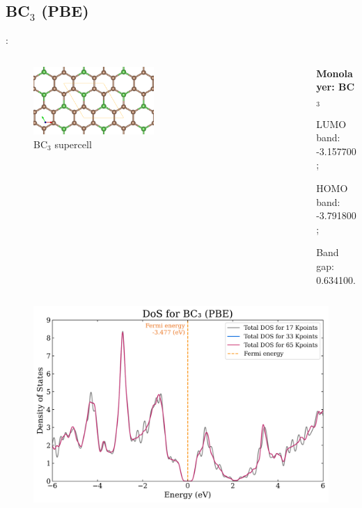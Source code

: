 \documentclass[xcolor=dvipsnames]{beamer}
\begin{document}
\subsection{BC\texorpdfstring{$_\text{3}$}{3} (PBE)}
\begin{frame}{\insertsection: \insertsubsection}
\begin{columns}
    \begin{column}{0.5\textwidth}\begin{figure}
        \includegraphics[width=0.5\textwidth]{Supercells/A_BC3.png}
        \caption{BC$_\text{3}$ supercell}
    \end{figure}\end{column}
    \begin{column}{0.5\textwidth}
        \par \textbf{Monolayer: BC$_\text{3}$}
        \par\quad LUMO band: -3.157700;
        \par\quad HOMO band: -3.791800;
        \par\quad Band gap: 0.634100.
    \end{column}
\end{columns}
\begin{columns}
    \begin{column}{0.45\textwidth}\begin{figure}
        \includegraphics[width=1\textwidth]{PDoS/BC3_dos.png}

\end{figure}
\end{column}
\end{columns}
\end{frame}
\end{document}
